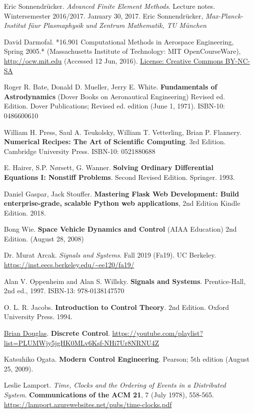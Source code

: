 \documentclass[10pt]{amsart}
\begin{document}
\begin{thebibliography}{9}
Eric Sonnendr\"{u}cker.  \emph{Advanced Finite Element Methods}.  Lecture notes.  Wintersemester 2016/2017.  January 30, 2017.  Eric Sonnendr\"{u}cker, \emph{Max-Planck-Institut f\"{u}ur Plasmaphysik und Zentrum Mathematik, TU M\"{u}nchen}

  David Darmofal. *16.901 Computational Methods in Aerospace Engineering, Spring 2005.* (Massachusetts Institute of Technology: MIT OpenCourseWare), \url{http://ocw.mit.edu} (Accessed 12 Jun, 2016). \href{http://creativecommons.org/licenses/by-nc-sa/4.0/}{License: Creative Commons BY-NC-SA}

Roger R. Bate, Donald D. Mueller, Jerry E. White. \textbf{Fundamentals of Astrodynamics} (Dover Books on Aeronautical Engineering) Revised ed. Edition. Dover Publications; Revised ed. edition (June 1, 1971). ISBN-10: 0486600610

William H. Press, Saul A. Teukolsky, William T. Vetterling, Brian P. Flannery. \textbf{Numerical Recipes: The Art of Scientific Computing}. 3rd Edition.  Cambridge University Press.  ISBN-10: 0521880688

E. Hairer, S.P. N\o rsett, G. Wanner. \textbf{Solving Ordinary Differential Equations I: Nonstiff Problems}. Second Revised Edition. Springer. 1993. 

Daniel Gaspar, Jack Stouffer.
\textbf{Mastering Flask Web Development: Build enterprise-grade, scalable Python web applications}, 2nd Edition Kindle Edition. 2018.

Bong Wie. \textbf{Space Vehicle Dynamics and Control} (AIAA Education) 2nd Edition. (August 28, 2008)

Dr. Murat Arcak. \emph{Signals and Systems}. Fall 2019 (Fa19). UC Berkeley. \url{https://inst.eecs.berkeley.edu/~ee120/fa19/}

Alan V. Oppenheim and Alan S. Willsky. \textbf{Signals and Systems}. Prentice-Hall, 2nd ed., 1997.  ISBN-13: 978-0138147570 

O. L. R. Jacobs. \textbf{Introduction to Control Theory}. 2nd Edition. Oxford University Press. 1994.

\href{https://www.youtube.com/channel/UCq0imsn84ShAe9PBOFnoIrg}{Brian Douglas}. \textbf{Discrete Control}. \url{https://youtube.com/playlist?list=PLUMWjy5jgHK0MLv6Ksf-NHi7Ur8NRNU4Z}

Katsuhiko Ogata. \textbf{Modern Control Engineering}. Pearson; 5th edition (August 25, 2009).

Leslie Lamport. \emph{Time, Clocks and the Ordering of Events in a Distributed System}. \textbf{Communications of the ACM 21}, 7   (July 1978), 558-565. \url{https://lamport.azurewebsites.net/pubs/time-clocks.pdf} 


  
\end{thebibliography}
\end{document}

